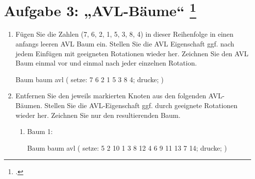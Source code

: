 \documentclass{lehramt-informatik-aufgabe}
\begin{document}
\liAufgabenTitel{}
\section{Aufgabe 3: „AVL-Bäume“
\footcite{66115:2014:03}}

\begin{enumerate}


\item Fügen Sie die Zahlen (7, 6, 2, 1, 5, 3, 8, 4) in dieser
Reihenfolge in einen anfangs leeren AVL Baum ein. Stellen Sie die AVL
Eigenschaft ggf. nach jedem Einfügen mit geeigneten Rotationen wieder
her. Zeichnen Sie den AVL Baum einmal vor und einmal nach jeder
einzelnen Rotation.

\begin{liProjektSprache}{Baum}
baum avl (
  setze: 7 6 2 1 5 3 8 4;
  drucke;
)
\end{liProjektSprache}
\begin{liEinbettung}
\end{liEinbettung}


\item Entfernen Sie den jeweils markierten Knoten aus den folgenden
AVL-Bäumen. Stellen Sie die AVL-Eigenschaft ggf. durch geeignete
Rotationen wieder her. Zeichnen Sie nur den resultierenden Baum.

\begin{enumerate}


\item Baum 1:

\begin{liProjektSprache}{Baum}
baum avl (
  setze: 5 2 10 1 3 8 12 4 6 9 11 13 7 14;
  drucke;
)
\end{liProjektSprache}
\begin{liEinbettung}
\end{liEinbettung}


\end{enumerate}
\end{enumerate}
\end{document}
